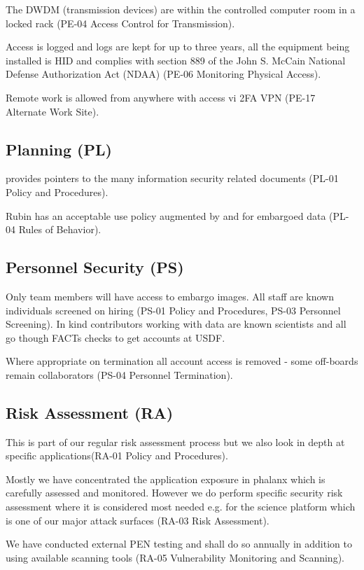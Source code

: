 The DWDM (transmission devices) are within the controlled computer room in a locked rack (PE-04  Access Control for Transmission).

Access is logged and logs are kept for up to three years, all the equipment being installed is HID and complies with section 889 of the John S. McCain National Defense Authorization Act (NDAA) (PE-06  Monitoring Physical Access).

Remote work is allowed  from anywhere with access vi 2FA VPN (PE-17  Alternate Work Site).

\subsection{Planning (PL)} \label{sec:PL}
 provides pointers to the many information security related documents (PL-01  Policy and Procedures).

Rubin has an acceptable use policy  augmented by   and  for embargoed data  (PL-04  Rules of Behavior).

\subsection{Personnel Security (PS)} \label{sec:PS}
Only  team members will have access to embargo images.
All staff are known individuals screened on hiring (PS-01  Policy and Procedures, PS-03  Personnel Screening).
In kind contributors working with data  are known scientists and all go though FACTs checks to get accounts at USDF.

Where appropriate on termination all account access is removed - some off-boards remain collaborators (PS-04  Personnel Termination).


\subsection{Risk Assessment (RA)} \label{sec:RA}
This is part of our regular risk assessment process  but we also look in depth at specific applications(RA-01  Policy and Procedures).

Mostly we have concentrated the application exposure in phalanx which is carefully assessed and monitored.
However we do perform specific security risk assessment where it is considered most needed e.g.  for the science platform which is one of our major attack surfaces (RA-03  Risk Assessment).

We have conducted external PEN testing and shall do so annually in addition to using available scanning tools (RA-05  Vulnerability Monitoring and Scanning).

